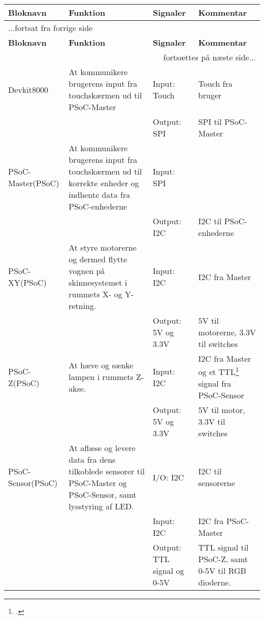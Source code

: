 \begin{center} \centering
    \begin{longtable}{|p{}|p{}|p{}|p{}|} \hline
	\textbf{Bloknavn} & \textbf{Funktion} & \textbf{Signaler} & \textbf{Kommentar} \\ \hline
	\endfirsthead
		
	\multicolumn{4}{l}{...fortsat fra forrige side} \\ \hline 
	\textbf{Bloknavn} & \textbf{Funktion} & \textbf{Signaler} & \textbf{Kommentar} \\ \hline
	\endhead

	\multicolumn{4}{r}{fortsættes på næste side...} \\
    \endfoot
    \endlastfoot
        
        Devkit8000
        & At kommunikere brugerens input fra touchskærmen ud til PSoC-Master
        & Input: Touch
        & Touch fra bruger
        \\ \cline{3-4}
        &
        & Output: SPI
        & SPI til PSoC-Master
        \\ \hline
        
        PSoC-Master(PSoC)
        & At kommunikere brugerens input fra touchskærmen ud til korrekte enheder og indhente data fra PSoC-enhederne
        & Input: SPI
        & 
        \\ \cline{3-4}
        &
        & Output: I2C
        & I2C til PSoC-enhederne
        \\ \hline
        
        PSoC-XY(PSoC)
        & At styre motorerne og dermed flytte vognen på skinnesystemet i rummets X- og Y-retning.
        & Input: I2C
        & I2C fra Master
        \\ \cline{3-4}
        &
        & Output: 5V og 3.3V
        & 5V til motorerne, 3.3V til switches
        \\ \hline
        
        PSoC-Z(PSoC)
        & At hæve og sænke lampen i rummets Z-akse. 
        & Input: I2C
        & I2C fra Master og et TTL\footcite{ttl} signal fra PSoC-Sensor
        \\ \cline{3-4}
        &
        & Output: 5V og 3.3V
        & 5V til motor, 3.3V til switches
        \\ \hline
        
        PSoC-Sensor(PSoC)
        & At aflæse og levere data fra dens tilkoblede sensorer til PSoC-Master og PSoC-Sensor, samt lysstyring af LED.
        & I/O: I2C 
        & I2C til sensorerne
        \\ \cline{3-4}
        &
        & Input: I2C
        & I2C fra PSoC-Master
        \\ \cline{3-4}
        &
        & Output: TTL signal og 0-5V  
        & TTL signal til PSoC-Z, samt 0-5V til RGB dioderne.
        \\ \hline
        

\end{longtable}
\end{center}
